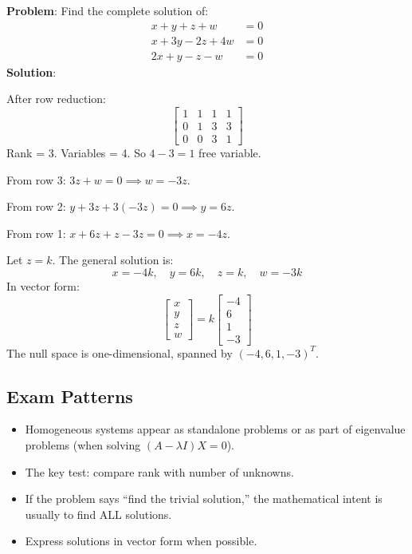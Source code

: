 \documentclass[
]{article}
\providecommand{\tightlist}{%
  \setlength{\itemsep}{0pt}\setlength{\parskip}{0pt}}
\begin{document}
\textbf{Problem}: Find the complete solution of:
\[
\begin{aligned}
x + y + z + w &= 0 \\
x + 3y - 2z + 4w &= 0 \\
2x + y - z - w &= 0
\end{aligned}
\]
\textbf{Solution}:

After row reduction:
\[
\begin{bmatrix}
1 & 1 & 1 & 1 \\
0 & 1 & 3 & 3 \\
0 & 0 & 3 & 1
\end{bmatrix}
\]
Rank = 3. Variables = 4. So \(4 - 3 = 1\) free variable.

From row 3: \(3z + w = 0 \implies w = -3z\).

From row 2: \(y + 3z + 3(-3z) = 0 \implies y = 6z\).

From row 1: \(x + 6z + z - 3z = 0 \implies x = -4z\).

Let \(z = k\). The general solution is:
\[
x = -4k, \quad y = 6k, \quad z = k, \quad w = -3k
\]
In vector form:
\[
\begin{bmatrix}
x \\
y \\
z \\
w
\end{bmatrix} = k \begin{bmatrix} -4 \\ 6 \\ 1 \\ -3 \end{bmatrix}
\]
The null space is one-dimensional, spanned by \((-4, 6, 1, -3)^T\).

\subsection{Exam Patterns}\label{exam-patterns-24}

\begin{itemize}
\tightlist
\item
  Homogeneous systems appear as standalone problems or as part of
  eigenvalue problems (when solving \((A - \lambda I)X = 0\)).
\item
  The key test: compare rank with number of unknowns.
\item
  If the problem says ``find the trivial solution,'' the mathematical
  intent is usually to find ALL solutions.
\item
  Express solutions in vector form when possible.
\end{itemize}
\end{document}
